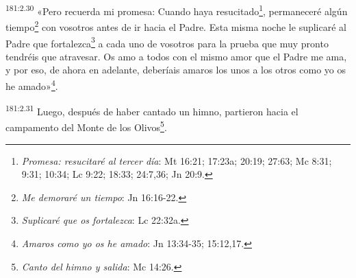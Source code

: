 \par
\textsuperscript{181:2.30} «Pero recuerda mi promesa: Cuando haya resucitado\footnote{\textit{Promesa: resucitaré al tercer día}: Mt 16:21; 17:23a; 20:19; 27:63; Mc 8:31; 9:31; 10:34; Lc 9:22; 18:33; 24:7,36; Jn 20:9.}, permaneceré algún tiempo\footnote{\textit{Me demoraré un tiempo}: Jn 16:16-22.} con vosotros antes de ir hacia el Padre. Esta misma noche le suplicaré al Padre que fortalezca\footnote{\textit{Suplicaré que os fortalezca}: Lc 22:32a.} a cada uno de vosotros para la prueba que muy pronto tendréis que atravesar. Os amo a todos con el mismo amor que el Padre me ama, y por eso, de ahora en adelante, deberíais amaros los unos a los otros como yo os he amado»\footnote{\textit{Amaros como yo os he amado}: Jn 13:34-35; 15:12,17.}.

\par
\textsuperscript{181:2.31} Luego, después de haber cantado un himno, partieron hacia el campamento del Monte de los Olivos\footnote{\textit{Canto del himno y salida}: Mc 14:26.}.